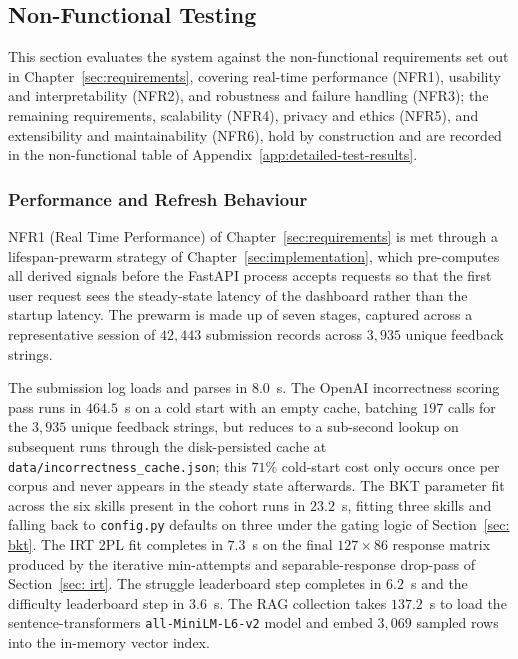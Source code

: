 \subsection{Non-Functional Testing} \label{sec:eval-nonfunctional}

This section evaluates the system against the non-functional requirements set out in Chapter~\ref{sec:requirements}, covering real-time performance (NFR1), usability and interpretability (NFR2), and robustness and failure handling (NFR3); the remaining requirements, scalability (NFR4), privacy and ethics (NFR5), and extensibility and maintainability (NFR6), hold by construction and are recorded in the non-functional table of Appendix~\ref{app:detailed-test-results}.




\subsubsection{Performance and Refresh Behaviour} \label{sec:eval-performance}
NFR1 (Real Time Performance) of Chapter~\ref{sec:requirements} is met through a lifespan-prewarm strategy of Chapter~\ref{sec:implementation}, which pre-computes all derived signals before the FastAPI process accepts requests so that the first user request sees the steady-state latency of the dashboard rather than the startup latency.
The prewarm is made up of seven stages, captured across a representative session of $42{,}443$ submission records across $3{,}935$ unique feedback strings.

The submission log loads and parses in $8.0$~s. The OpenAI incorrectness scoring pass runs in $464.5$~s on a cold start with an empty cache, batching $197$ calls for the $3{,}935$ unique feedback strings, but reduces to a sub-second lookup on subsequent runs through the disk-persisted cache at \texttt{data/incorrectness\_cache.json}; this $71\%$ cold-start cost only occurs once per corpus and never appears in the steady state afterwards.
The BKT parameter fit across the six skills present in the cohort runs in $23.2$~s, fitting three skills and falling back to \texttt{config.py} defaults on three under the gating logic of Section~\ref{sec: bkt}. 
The IRT 2PL fit completes in $7.3$~s on the final $127 \times 86$ response matrix produced by the iterative min-attempts and separable-response drop-pass of Section~\ref{sec: irt}. 
The struggle leaderboard step completes in $6.2$~s and the difficulty leaderboard step in $3.6$~s. The RAG collection takes $137.2$~s to load the sentence-transformers \texttt{all-MiniLM-L6-v2} model and embed $3{,}069$ sampled rows into the in-memory vector index.

